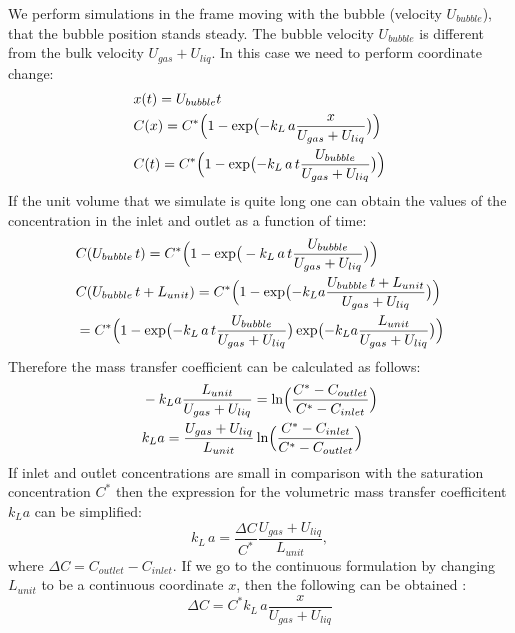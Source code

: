 \documentclass{article}
\newcommand{\beq}{\begin{equation}}
\newcommand{\feq}{\end{equation}}
\newcommand{\beqal}{\begin{equation}\begin{aligned}}
\newcommand{\feqal}{\end{aligned}\end{equation}}
\newcommand{\vol}{k_L\,a}
\begin{document}
We perform simulations in the frame moving with the bubble (velocity
$U_{bubble}$), that the bubble position stands steady. The bubble velocity $U_{bubble}$ is
different from the bulk velocity $U_{gas}+U_{liq}$. In this case we need to perform coordinate
change:
\beqal
&x(t)=U_{bubble}t\\
&C(x)=C^{*}\Bigl(1-\exp\bigl(-k_L\, a \frac{x}{U_{gas}+U_{liq}}\bigr)\Bigr)\\
&C(t)=C^{*}\Bigl(1-\exp\bigl(-k_L\, a\, t \frac{U_{bubble}}{U_{gas}+U_{liq}}\bigr)\Bigr)
\feqal
If the unit volume that we simulate is quite long one can obtain the values of the concentration
in the inlet and outlet as a function of time:
\beqal
&C(U_{bubble}\, t)=C^{*}\Bigl(1-\exp\bigr(-k_L\, a\, t
\frac{U_{bubble}}{U_{gas}+U_{liq}}\bigr)\Bigr)\\
&C(U_{bubble}\,t+L_{unit})=C^{*}\Bigl(1-\exp\bigl(-k_L a \frac{
U_{bubble}\,t+L_{unit}}{U_{gas}+U_{liq}}\bigr)\Bigr)\\
&=C^{*}\Bigl(1-\exp\bigl(-k_L\, a\, t \frac{U_{bubble}}{U_{gas}+U_{liq}}\bigr)\exp\bigl(-k_L a
\frac{L_{unit}}{U_{gas}+U_{liq}}\bigr)\Bigr)
\feqal
Therefore the mass transfer coefficient can be calculated as follows:
\begin{equation}
\label{theor:continuous:mass:transfer}
\begin{aligned}
&-k_L a \frac{L_{unit}}{U_{gas}+U_{liq}}=\ln\Bigl(\frac{C^{*}-C_{outlet}}{C^{*}-C_{inlet}}\Bigr)\\
&k_L a
=\frac{U_{gas}+U_{liq}}{L_{unit}}\ln\Bigl(\frac{C^{*}-C_{inlet}}{C^{*}-C_{outlet}}
\Bigr)
\end{aligned}
\end{equation}
If inlet and outlet concentrations are small in comparison with the saturation concentration $C^{*}$
then the expression for the volumetric mass transfer coefficitent $k_L a$ can be simplified:
\beq
\vol=\frac{\Delta C}{C^{*}} \frac{U_{gas}+U_{liq}}{L_{unit}},
\feq
where $\Delta C=C_{outlet}-C_{inlet}$. If we go to the continuous formulation by changing $L_{unit}$
to be a continuous coordinate $x$, then the following can be obtained \cite{jos-mass}:
\beq
\Delta C = C^{*} \vol \frac{x}{U_{gas}+U_{liq}}
\label{small:conc:mass:estimation}
\feq
\end{document}
